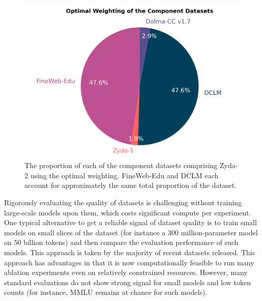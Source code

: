 \documentclass[conference]{IEEEtran}
\begin{document}
\begin{figure}[t]
    \centering
    \includegraphics[width=0.9\linewidth]{figures/optimal_weighted_pie_chart.png}
    \caption{The proportion of each of the component datasets comprising Zyda-2 using the optimal weighting. FineWeb-Edu and DCLM each account for approximately the same total proportion of the dataset.}
    \label{optimal_weighted_pie_chart}
\end{figure}

Rigorously evaluating the quality of datasets is challenging without training large-scale models upon them, which costs significant compute per experiment. One typical alternative to get a reliable signal of dataset quality is to train small models on small slices of the dataset (for instance a 300 million-parameter model on 50 billion tokens) and then compare the evaluation performance of such models. This approach is taken by the majority of recent datasets released. This approach has advantages in that it is now computationally feasible to run many ablation experiments even on relatively constrained resources. However, many standard evaluations do not show strong signal for small models and low token counts (for instance, MMLU remains at chance for such models). 
\end{document}
